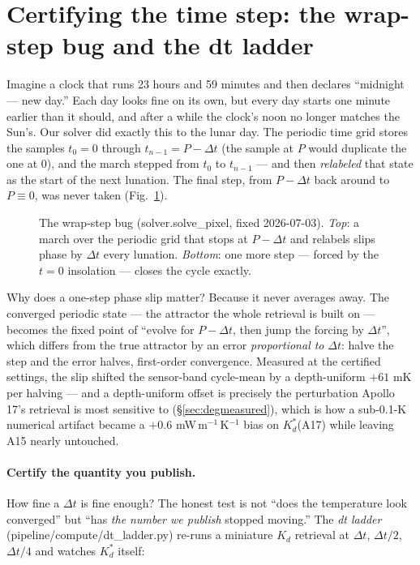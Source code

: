 \documentclass[11pt]{report}
\newcommand{\code}[1]{{\ttfamily\small #1}}
\begin{document}
\section{Certifying the time step: the wrap-step bug and the dt
ladder}\label{app:dtcert}

\begin{plain}
Imagine a clock that runs 23 hours and 59 minutes and then declares
``midnight --- new day.'' Each day looks fine on its own, but every day
starts one minute earlier than it should, and after a while the clock's
noon no longer matches the Sun's. Our solver did exactly this to the lunar
day. The periodic time grid stores the samples $t_0{=}0$ through
$t_{n-1}{=}P{-}\Delta t$ (the sample at $P$ would duplicate the one at 0),
and the march stepped from $t_0$ to $t_{n-1}$ --- and then \emph{relabeled}
that state as the start of the next lunation. The final step, from
$P{-}\Delta t$ back around to $P\equiv 0$, was never taken
(Fig.~\ref{fig:wrapstep}).
\end{plain}

\begin{figure}[htbp]\centering

\caption{The wrap-step bug (\code{solver.solve\_pixel}, fixed 2026-07-03).
\emph{Top}: a march over the periodic grid that stops at $P{-}\Delta t$ and
relabels slips phase by $\Delta t$ every lunation. \emph{Bottom}: one more
step --- forced by the $t{=}0$ insolation --- closes the cycle exactly.}
\label{fig:wrapstep}
\end{figure}

Why does a one-step phase slip matter? Because it never averages away. The
converged periodic state --- the attractor the whole retrieval is built on
--- becomes the fixed point of ``evolve for $P-\Delta t$, then jump the
forcing by $\Delta t$'', which differs from the true attractor by an error
\emph{proportional to} $\Delta t$: halve the step and the error halves,
first-order convergence. Measured at the certified settings, the slip
shifted the sensor-band cycle-mean by a depth-uniform $+61$ mK per halving
--- and a depth-uniform offset is precisely the perturbation Apollo 17's
retrieval is most sensitive to (\S\ref{sec:degmeasured}), which is how a
sub-0.1-K numerical artifact became a $+0.6$ mW\,m$^{-1}$\,K$^{-1}$ bias on
$K_d^{*}$(A17) while leaving A15 nearly untouched.

\paragraph{Certify the quantity you publish.} How fine a $\Delta t$ is fine
enough? The honest test is not ``does the temperature look converged'' but
``has \emph{the number we publish} stopped moving.'' The \emph{dt ladder}
(\code{pipeline/compute/dt\_ladder.py}) re-runs a miniature $K_d$ retrieval
at $\Delta t$, $\Delta t/2$, $\Delta t/4$ and watches $K_d^{*}$ itself:
\end{document}
